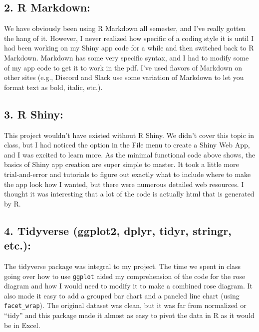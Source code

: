 \documentclass[
  dvipsnames]{article}
\begin{document}
\hypertarget{section-10}{%
\subsection{\texorpdfstring{\textcolor{TealBlue}{2. R Markdown:}}{}}\label{section-10}}

We have obviously been using R Markdown all semester, and I've really
gotten the hang of it. However, I never realized how specific of a
coding style it is until I had been working on my Shiny app code for a
while and then switched back to R Markdown. Markdown has some very
specific syntax, and I had to modify some of my app code to get it to
work in the pdf. I've used flavors of Markdown on other sites (e.g.,
Discord and Slack use some variation of Markdown to let you format text
as bold, italic, etc.).

\hypertarget{section-11}{%
\subsection{\texorpdfstring{\textcolor{TealBlue}{3. R Shiny:}}{}}\label{section-11}}

This project wouldn't have existed without R Shiny. We didn't cover this
topic in class, but I had noticed the option in the File menu to create
a Shiny Web App, and I was excited to learn more. As the minimal
functional code above shows, the basics of Shiny app creation are super
simple to master. It took a little more trial-and-error and tutorials to
figure out exactly what to include where to make the app look how I
wanted, but there were numerous detailed web resources. I thought it was
interesting that a lot of the code is actually html that is generated by
R.

\hypertarget{section-12}{%
\subsection{\texorpdfstring{\textcolor{TealBlue}{4. Tidyverse (ggplot2, dplyr, tidyr, stringr, etc.):}}{}}\label{section-12}}

The tidyverse package was integral to my project. The time we spent in
class going over how to use \texttt{ggplot} aided my comprehension of
the code for the rose diagram and how I would need to modify it to make
a combined rose diagram. It also made it easy to add a grouped bar chart
and a paneled line chart (using \texttt{facet\_wrap}). The original
dataset was clean, but it was far from normalized or ``tidy'' and this
package made it almost as easy to pivot the data in R as it would be in
Excel.
\end{document}
